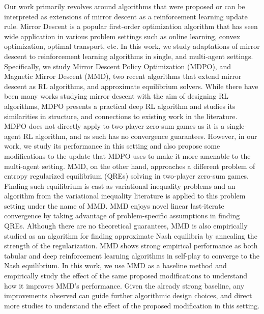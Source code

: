 Our work primarily revolves around algorithms that were proposed or can be interpreted as
extensions of mirror descent as a reinforcement learning update rule.
Mirror Descent is a popular first-order optimization algorithm that has seen wide application in
various problem settings such as online learning, convex optimization, optimal transport, etc. In
this work, we study adaptations of mirror descent to reinforcement learning algorithms in single,
and multi-agent settings.
Specifically, we study Mirror Descent Policy Optimization (MDPO), and Magnetic Mirror Descent
(MMD), two recent algorithms that extend mirror descent as RL algorithms, and approximate
equilibrium solvers.
While there have been many works studying mirror descent with the aim of designing RL algorithms,
MDPO presents a practical deep RL algorithm and studies its similarities in structure, and
connections to existing work in the literature.
MDPO does not directly apply to two-player zero-sum games as it is a single-agent RL algorithm, and
as such has no convergence guarantees.
However, in our work, we study its performance in this setting and also propose some modifications
to the update that MDPO uses to make it more amenable to the multi-agent setting.
MMD, on the other hand, approaches a different problem of entropy regularized equilibrium (QREs)
solving in two-player zero-sum games.
Finding such equilibrium is cast as variational inequality problems and an algorithm from the
variational inequality literature is applied to this problem setting under the name of MMD.
MMD enjoys novel linear last-iterate convergence by taking advantage of problem-specific
assumptions in finding QREs.
Although there are no theoretical guarantees, MMD is also empirically studied as an algorithm for
finding approximate Nash equilibria by annealing the strength of the regularization.
MMD shows strong empirical performance as both tabular and deep reinforcement learning algorithms
in self-play to converge to the Nash equilibrium.
In this work, we use MMD as a baseline method and empirically study the effect of the same proposed
modifications to understand how it improves MMD's performance.
Given the already strong baseline, any improvements observed can guide further algorithmic design
choices, and direct more studies to understand the effect of the proposed modification in this
setting.

